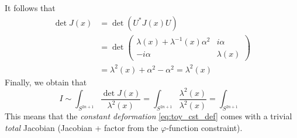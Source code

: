 \documentclass[a4paper,11pt]{article}
\theoremstyle{definition}
\newcommand{\mat}[4]{\begin{pmatrix} #1 & #2 \\ #3 & #4 \end{pmatrix}}
\begin{document}
It follows that 
\begin{equation}
  \begin{split} 
    \det J(x) &= \det( U^* J(x) U) \\
    &= \det \mat{\lambda(x) + \lambda^{-1}(x) \alpha^2}{i\alpha}{-i\alpha}{\lambda(x)} \\
    &= \lambda^2(x) + \alpha^2 - \alpha^2 = \lambda^2(x)
  \end{split}
\end{equation}
Finally, we obtain that
\begin{equation}
  I \sim \int_{S^{2n+1}} \frac{\det J(x)}{\lambda^2(x)} = \int_{S^{2n+1}} \frac{\lambda^2(x)}{\lambda^2(x)} = \int_{S^{2n+1}}
\end{equation}
This means that the \emph{constant deformation} \eqref{eq:toy_cst_def} comes with a trivial \emph{total} Jacobian (Jacobian + factor from the $\varphi$-function constraint).
\end{document}
